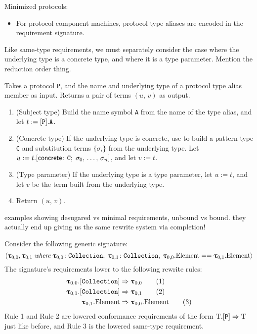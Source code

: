\documentclass[../generics]{subfiles}
\begin{document}
Minimized protocols:
\begin{itemize}
\item For protocol component machines, protocol type aliases are encoded in the requirement signature. 
\end{itemize}

Like same-type requirements, we must separately consider the case where the underlying type is a concrete type, and where it is a type parameter. Mention the reduction order thing.

\begin{algorithm}
Takes a protocol \texttt{P}, and the name and underlying type of a protocol type alias member as input. Returns a pair of terms $(u,\,v)$ as output.
\begin{enumerate}
\item (Subject type) Build the name symbol \texttt{A} from the name of the type alias, and let $t := [\texttt{P}].\texttt{A}$.
\item (Concrete type) If the underlying type is concrete, use  to build a pattern type \texttt{C} and substitution terms $\{\sigma_i\}$ from the underlying type. Let $u := t.[\mathsf{concrete}\colon \texttt{C};\;\sigma_0,\,\ldots,\,\sigma_n]$, and let $v := t$.
\item (Type parameter) If the underlying type is a type parameter, let $u := t$, and let $v$ be the term built from the underlying type.
\item Return $(u,\,v)$.
\end{enumerate}
\end{algorithm}

examples showing desugared vs minimal requirements, unbound vs bound. they actually end up giving us the same rewrite system via completion!

Consider the following generic signature:
\[\langle \bm{\uptau}_{0,0},\bm{\uptau}_{0,1}\;\textit{where}\;\bm{\uptau}_{0,0}\colon\texttt{Collection},\;\bm{\uptau}_{0,1}\colon\texttt{Collection},\;\bm{\uptau}_{0,0}.\mathrm{Element}==\bm{\uptau}_{0,1}.\mathrm{Element}\rangle\]
The signature's requirements lower to the following rewrite rules:
\begin{align}
\bm{\uptau}_{0,0}.[\texttt{Collection}]&\Rightarrow\bm{\uptau}_{0,0}\tag{1}\\
\bm{\uptau}_{0,1}.[\texttt{Collection}]&\Rightarrow\bm{\uptau}_{0,1}\tag{2}\\
\bm{\uptau}_{0,1}.\mathrm{Element}&\Rightarrow\bm{\uptau}_{0,0}.\mathrm{Element}\tag{3}
\end{align}
Rule 1 and Rule 2 are lowered conformance requirements of the form $\mathrm{T}.[\texttt{P}]\Rightarrow\mathrm{T}$ just like before, and Rule 3 is the lowered same-type requirement.
\end{document}
